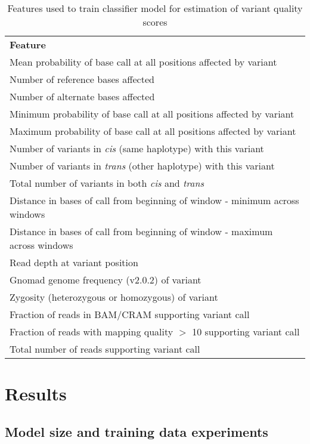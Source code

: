 \documentclass[]{article}
\begin{document}
\begin{center}
	\begin{table}
	\begin{tabular}{ l }
	 \textbf{Feature} \\
	 Mean probability of base call at all positions affected by variant \\ 
	 Number of reference bases affected \\
	 Number of alternate bases affected \\
	 Minimum probability of base call at all positions affected by variant \\
	 Maximum probability of base call at all positions affected by variant \\
	 Number of variants in \textit{cis} (same haplotype) with this variant \\
	 Number of variants in \textit{trans} (other haplotype) with this variant \\ 
	 Total number of variants in both \textit{cis} and \textit{trans} \\
	 Distance in bases of call from beginning of window - minimum across windows \\
	 Distance in bases of call from beginning of window - maximum across windows \\
	 Read depth at variant position \\
	 Gnomad genome frequency (v2.0.2) of variant \\
	 Zygosity (heterozygous or homozygous) of variant \\
	 Fraction of reads in BAM/CRAM supporting variant call \\
	 Fraction of reads with mapping quality $>$ 10 supporting variant call \\
	 Total number of reads supporting variant call \\
	\end{tabular}
	\label{table:features}
	\caption{ Features used to train classifier model for estimation of variant quality scores }
\end{table}
\end{center}

\section{Results}

\subsection{Model size and training data experiments}
\end{document}
